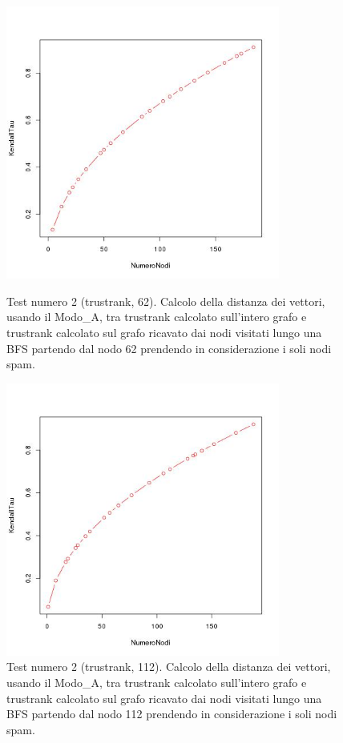 \begin{figure}
\centering
 \includegraphics[height=9cm]{immagini/test2/trustrankBadNodesTestMode0_62}
 \caption{Test numero 2 (trustrank, 62). Calcolo della distanza dei vettori, usando il Modo\_A, tra trustrank calcolato sull'intero grafo e trustrank calcolato sul grafo ricavato dai nodi visitati lungo una BFS partendo dal nodo 62 prendendo in considerazione i soli nodi spam. }
 \label{fig:test2trustModoA62}
\centering
 \includegraphics[height=9cm]{immagini/test2/trustrankBadNodesTestMode0_112}
 \caption{Test numero 2 (trustrank, 112). Calcolo della distanza dei vettori, usando il Modo\_A, tra trustrank calcolato sull'intero grafo e trustrank calcolato sul grafo ricavato dai nodi visitati lungo una BFS partendo dal nodo 112 prendendo in considerazione i soli nodi spam.}
 \label{fig:test2trustModoA112}
\end{figure}

